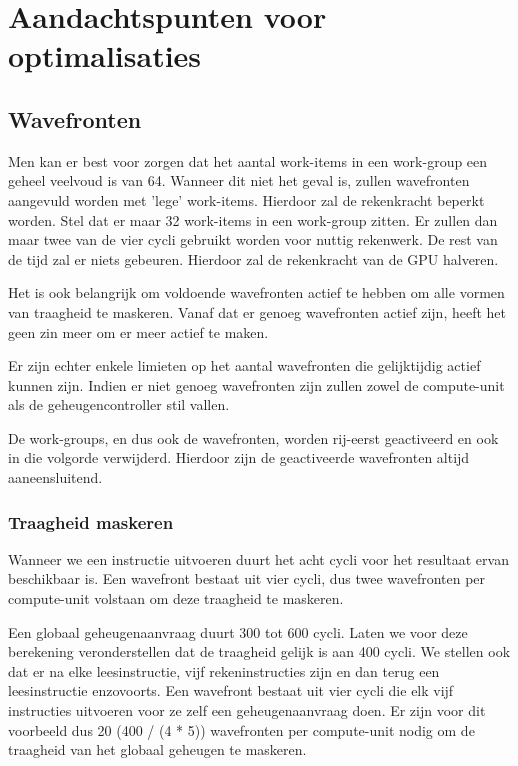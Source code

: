 \section{Aandachtspunten voor optimalisaties}
\subsection{Wavefronten}
Men kan er best voor zorgen dat het aantal work-items in een work-group een geheel veelvoud is van 64. Wanneer dit niet het geval is, zullen wavefronten aangevuld worden met 'lege' work-items. Hierdoor zal de rekenkracht beperkt worden. Stel dat er maar 32 work-items in een work-group zitten. Er zullen dan maar twee van de vier cycli gebruikt worden voor nuttig rekenwerk. De rest van de tijd zal er niets gebeuren. Hierdoor zal de rekenkracht van de GPU halveren.

Het is ook belangrijk om voldoende wavefronten actief te hebben om alle vormen van traagheid te maskeren. Vanaf dat er genoeg wavefronten actief zijn, heeft het geen zin meer om er meer actief te maken.

Er zijn echter enkele limieten op het aantal wavefronten die gelijktijdig actief kunnen zijn. Indien er niet genoeg wavefronten zijn zullen zowel de compute-unit als de geheugencontroller stil vallen.

De work-groups, en dus ook de wavefronten, worden rij-eerst geactiveerd en ook in die volgorde verwijderd\cite[p.~6-8]{amd}. Hierdoor zijn de geactiveerde wavefronten altijd aaneensluitend.

\subsubsection{Traagheid maskeren}
Wanneer we een instructie uitvoeren duurt het acht cycli voor het resultaat ervan beschikbaar is. Een wavefront bestaat uit vier cycli, dus twee wavefronten per compute-unit volstaan om deze traagheid te maskeren.

Een globaal geheugenaanvraag duurt 300 tot 600 cycli. Laten we voor deze berekening veronderstellen dat de traagheid gelijk is aan 400 cycli. We stellen ook dat er na elke leesinstructie, vijf rekeninstructies zijn en dan terug een leesinstructie enzovoorts. Een wavefront bestaat uit vier cycli die elk vijf instructies uitvoeren voor ze zelf een geheugenaanvraag doen. Er zijn voor dit voorbeeld dus 20 (400 / (4 * 5)) wavefronten per compute-unit nodig om de traagheid van het globaal geheugen te maskeren.

